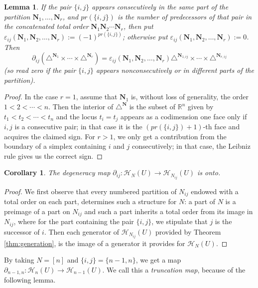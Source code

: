 \documentclass[12pt,letterpaper]{amsart}
\numberwithin{equation}{section}
\def\Nbold{{\mathbf N}}
\def\RR{{\mathbb R}}
\def\eps{\varepsilon}
\def\tri{\triangle}
\newcommand{\p}{\partial}
\def\Hcal{{\mathcal H}}
\newtheorem{lemma}[theorem]{Lemma}
\newtheorem{corollary}[theorem]{Corollary}
\theoremstyle{remark}
\begin{document}
\begin{lemma}\label{lemma:onetrunccomptri}
If the pair $\{i,j\}$ appears consecutively in the same part of the partition $\Nbold_1,\ldots, \Nbold_r$, and $pr(\{i,j\})$ is the number of predecessors of that pair in the concatenated total order $\Nbold_1\Nbold_2\cdots\Nbold_r$, then put 
$\eps_{ij}(\Nbold_1,\Nbold_2,\ldots,\Nbold_r):=(-1)^{{pr(\{i,j\})}}$; otherwise  put  $\eps_{ij}(\Nbold_1,\Nbold_2,\ldots,\Nbold_r):=0$. Then 
$$\p_{ij}(\tri^{\Nbold_1}\times \cdots \times \tri^{\Nbold_r})= \eps_{ij}(\Nbold_1,\Nbold_2,\ldots,\Nbold_r)\tri^{\Nbold_{1,ij}}\times \cdots \times \tri^{\Nbold_{r,ij}}$$ 
(so read zero if the pair $\{i,j\}$ appears nonconsecutively or in different parts of the partition). 
\end{lemma}



\begin{proof}
In the case $r=1$, assume that  $\Nbold_1$ is, without loss of generality, the order $1<2<\cdots <n$. Then the interior of $\tri^{\Nbold}$ is the subset of $\RR^n$
given by $t_1<t_2<\cdots <t_n$ and the locus $t_i=t_j$ appears as a  codimension one face only if $i,j$ is a consecutive pair; in that case it is the $(pr(\{i,j\})+1)$-th face and acquires the claimed sign. For $r>1$, we only get a contribution from the boundary of a simplex containing $i$ and $j$ consecutively; in that case, the Leibniz rule gives us the correct sign.
\end{proof}

\begin{corollary}\label{cor:}
The degeneracy  map $\p_{ij}: \Hcal_N(U)\to \Hcal_{N_{ij}}(U)$ is onto.
\end{corollary}
\begin{proof}
We first observe that every numbered partition of $N_{ij}$ endowed with a total order on each part, determines such a structure for $N$: a part of $N$ is a  preimage of a part on $N_{ij}$ and such a part inherits a  total order from its image in $N_{ij}$, where for the part containing the pair $\{i,j\}$,  we stipulate that  $j$ is the successor of $i$. Then 
each generator of  $\Hcal_{N_{ij}}(U)$ provided by Theorem \ref{thm:generation}, is the image of a generator it provides for $\Hcal_{N}(U)$.
\end{proof}

By taking $N=[n]$ and  $\{i,j\}=\{n-1,n\}$, we get  a map $\p_{n-1,n}: \Hcal_n(U)\to \Hcal_{n-1}(U)$. 
We call this a \emph{truncation map}, because of the following lemma.
\end{document}
